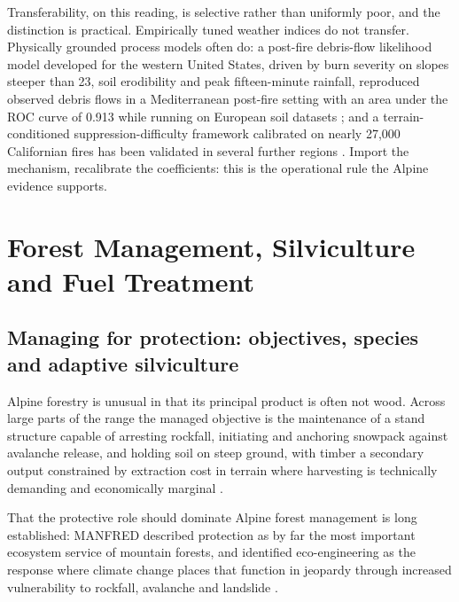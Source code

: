 \documentclass[11pt,a4paper]{article}
\begin{document}
Transferability, on this reading, is selective rather than uniformly poor, and the distinction is practical. Empirically tuned weather indices do not transfer. Physically grounded process models often do: a post-fire debris-flow likelihood model developed for the western United States, driven by burn severity on slopes steeper than 23\degree{}, soil erodibility and peak fifteen-minute rainfall, reproduced observed debris flows in a Mediterranean post-fire setting with an area under the ROC curve of 0.913 while running on European soil datasets \citep{diakakis_exploring_2023}; and a terrain-conditioned suppression-difficulty framework calibrated on nearly 27{,}000 Californian fires has been validated in several further regions \citep{cardil_assessing_2025}. Import the mechanism, recalibrate the coefficients: this is the operational rule the Alpine evidence supports.


\section{Forest Management, Silviculture and Fuel Treatment}
\label{sec:silviculture}

\subsection{Managing for protection: objectives, species and adaptive silviculture}

Alpine forestry is unusual in that its principal product is often not wood. Across large parts of the range the managed objective is the maintenance of a stand structure capable of arresting rockfall, initiating and anchoring snowpack against avalanche release, and holding soil on steep ground, with timber a secondary output constrained by extraction cost in terrain where harvesting is technically demanding and economically marginal \citep{dinca_timber_2025}.

That the protective role should dominate Alpine forest management is long established: MANFRED described protection as by far the most important ecosystem service of mountain forests, and identified eco-engineering as the response where climate change places that function in jeopardy through increased vulnerability to rockfall, avalanche and landslide \citep{jandl_management_2013}.
\end{document}
